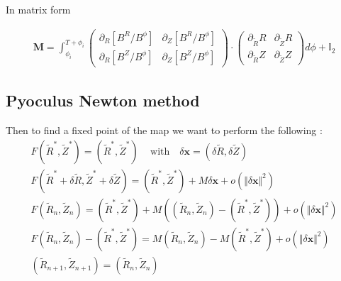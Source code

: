 In matrix form

\begin{align}
    \textbf{M} = \int_{\phi_i}^{T+\phi_i}\begin{pmatrix}
        \partial_{R}\left[B^R/B^\phi\right] & \partial_{Z}\left[B^R/B^\phi\right]\\
        \partial_{R}\left[B^Z/B^\phi\right] & \partial_{Z}\left[B^Z/B^\phi\right]
    \end{pmatrix}\cdot\begin{pmatrix}
        \partial_{\tilde{R}}R & \partial_{\tilde{Z}}R\\
        \partial_{\tilde{R}}Z & \partial_{\tilde{Z}}Z
    \end{pmatrix}d\phi + \mathbb{I}_2
\end{align}

\subsection{Pyoculus Newton method}

Then to find a fixed point of the map we want to perform the following :
\begin{align*}
    F(\tilde{R}^*, \tilde{Z}^*) = (\tilde{R}^*, \tilde{Z}^*)\,\quad\text{with}\quad \delta\textbf{x}=(\delta \tilde{R}, \delta \tilde{Z})\\
    F(\tilde{R}^*+\delta \tilde{R}, \tilde{Z}^*+\delta \tilde{Z}) = (\tilde{R}^*, \tilde{Z}^*) + M\delta\textbf{x}+ o(\Vert \delta\textbf{x}\Vert^2)\\
    F(\tilde{R}_n,\tilde{Z}_n) = (\tilde{R}^*, \tilde{Z}^*) + M((\tilde{R}_n,\tilde{Z}_n) - (\tilde{R}^*, \tilde{Z}^*))+ o(\Vert \delta\textbf{x}\Vert^2)\\
    F(\tilde{R}_n,\tilde{Z}_n) - (\tilde{R}^*, \tilde{Z}^*)  = M(\tilde{R}_n,\tilde{Z}_n) - M(\tilde{R}^*, \tilde{Z}^*)+ o(\Vert \delta\textbf{x}\Vert^2)\\
    (\tilde{R}_{n+1},\tilde{Z}_{n+1}) = (\tilde{R}_n,\tilde{Z}_n)
\end{align*}
